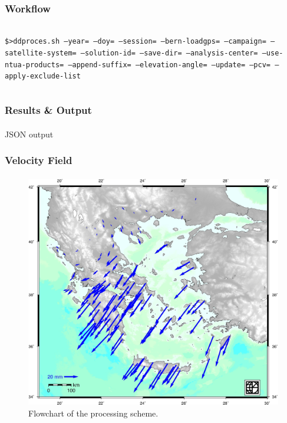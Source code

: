 \documentclass{beamer}
\begin{document}
\begin{frame}\frametitle{Workflow}\framesubtitle{}
\begin{columns}[T] %
\begin{column}{.48\textwidth}
  \texttt{\$>ddproces.sh --year= --doy= --session= --bern-loadgps= --campaign= --satellite-system= --solution-id= --save-dir= --analysis-center= --use-ntua-products= --append-suffix= --elevation-angle= --update= --pcv= --apply-exclude-list}
\end{column}
\hfill%
\begin{column}{.48\textwidth}
\end{column}
\end{columns}
\end{frame}

\begin{frame}\frametitle{Results \& Output}\framesubtitle{}
JSON output
\end{frame}

\begin{frame}\frametitle{Velocity Field}\framesubtitle{}
 \begin{figure}
 \begin{center}
 \includegraphics[width=.8\textwidth]{img/testvel.jpg}
 \caption{Flowchart of the processing scheme.}
 \label{fig:dgrm}
 \end{center}
 \end{figure}
\end{frame}
\end{document}
